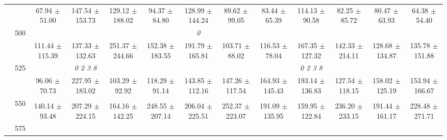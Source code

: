 \begin{table}[h]
{\begin{tabular}{
        ccccccccccccc}
 & & \cellcolor[HTML]{EFEFEF} 67.94 $\pm$ 51.00& \cellcolor[HTML]{EFEFEF} 147.54 $\pm$ 153.73& \cellcolor[HTML]{EFEFEF} 129.12 $\pm$ 188.02& \cellcolor[HTML]{EFEFEF} 94.37 $\pm$ 84.80& \cellcolor[HTML]{EFEFEF} 128.99 $\pm$ 144.24& \cellcolor[HTML]{EFEFEF} 89.62 $\pm$ 99.05& \cellcolor[HTML]{EFEFEF} 83.44 $\pm$ 65.39& \cellcolor[HTML]{EFEFEF} 114.13 $\pm$ 90.58& \cellcolor[HTML]{EFEFEF} 82.25 $\pm$ 85.72& \cellcolor[HTML]{EFEFEF} 80.47 $\pm$ 63.93& \cellcolor[HTML]{EFEFEF} 64.38 $\pm$ 54.40 \\ 
 & \multirow{2}{*}{500}& & & & & \textit{ 0 }& & & & & &  \\ 
 & & 111.44 $\pm$ 115.39& 137.33 $\pm$ 132.63& 251.37 $\pm$ 244.66& 152.38 $\pm$ 183.55& 191.79 $\pm$ 165.81& 103.71 $\pm$ 88.02& 116.53 $\pm$ 78.04& 167.35 $\pm$ 127.32& 142.33 $\pm$ 214.11& 128.68 $\pm$ 134.87& 135.78 $\pm$ 151.88 \\ 
 & \multirow{2}{*}{525}& \cellcolor[HTML]{EFEFEF} & \cellcolor[HTML]{EFEFEF} \textit{ 0 2 3 8 }& \cellcolor[HTML]{EFEFEF} & \cellcolor[HTML]{EFEFEF} & \cellcolor[HTML]{EFEFEF} & \cellcolor[HTML]{EFEFEF} & \cellcolor[HTML]{EFEFEF} & \cellcolor[HTML]{EFEFEF} \textit{ 0 2 3 8 }& \cellcolor[HTML]{EFEFEF} & \cellcolor[HTML]{EFEFEF} & \cellcolor[HTML]{EFEFEF}  \\ 
 & & \cellcolor[HTML]{EFEFEF} 96.06 $\pm$ 70.73& \cellcolor[HTML]{EFEFEF} 227.95 $\pm$ 183.02& \cellcolor[HTML]{EFEFEF} 103.29 $\pm$ 92.92& \cellcolor[HTML]{EFEFEF} 118.29 $\pm$ 91.14& \cellcolor[HTML]{EFEFEF} 143.85 $\pm$ 112.16& \cellcolor[HTML]{EFEFEF} 147.26 $\pm$ 117.54& \cellcolor[HTML]{EFEFEF} 164.93 $\pm$ 145.43& \cellcolor[HTML]{EFEFEF} 193.14 $\pm$ 136.83& \cellcolor[HTML]{EFEFEF} 127.54 $\pm$ 118.15& \cellcolor[HTML]{EFEFEF} 158.02 $\pm$ 125.19& \cellcolor[HTML]{EFEFEF} 153.94 $\pm$ 166.67 \\ 
 & \multirow{2}{*}{550}& & & & & & & & & & &  \\ 
 & & 140.14 $\pm$ 93.48& 207.29 $\pm$ 224.15& 164.16 $\pm$ 142.25& 248.55 $\pm$ 207.14& 206.04 $\pm$ 225.51& 252.37 $\pm$ 223.07& 191.09 $\pm$ 135.95& 159.95 $\pm$ 122.84& 236.20 $\pm$ 233.15& 191.44 $\pm$ 161.17& 228.48 $\pm$ 271.71 \\ 
 & \multirow{2}{*}{575}& \cellcolor[HTML]{EFEFEF} & \cellcolor[HTML]{EFEFEF} & \cellcolor[HTML]{EFEFEF} & \cellcolor[HTML]{EFEFEF} & \cellcolor[HTML]{EFEFEF} & \cellcolor[HTML]{EFEFEF} & \cellcolor[HTML]{EFEFEF} & \cellcolor[HTML]{EFEFEF} & \cellcolor[HTML]{EFEFEF} & \cellcolor[HTML]{EFEFEF} & \cellcolor[HTML]{EFEFEF}  \\ 

\end{tabular}}
\end{table}
